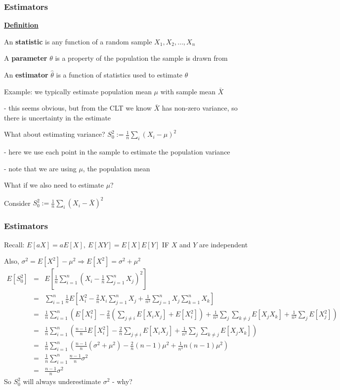 \documentclass[t,8pt]{beamer}%
\begin{document}
\begin{frame}
	\frametitle{Estimators}
        {\bf\underline{Definition}} \par
        An {\bf statistic} is any function of a random sample $X_1,X_2,\dots,X_n$ \par
        A {\bf parameter} $\theta$ is a property of the population the sample is drawn from \par
        An {\bf estimator} $\hat\theta$ is a function of statistics used to estimate $\theta$ \par
	Example: we typically estimate population mean $\mu$ with sample mean $\bar X$\par
	{\small\color{NavyBlue} - this seems obvious, but from the CLT we know $\bar X$ has non-zero variance, so there is uncertainty in the estimate} \par
	What about estimating variance?
	$S_0^2:=\frac 1n\sum_i(X_i-\mu)^2$ \par
	{\small\color{NavyBlue} - here we use each point in the sample to estimate the population variance \par
		- note that we are using $\mu$, the population mean} \par
	What if we also need to estimate $\mu$? \par Consider $S_0^2:=\frac 1n\sum_i(X_i-\bar X)^2$
\end{frame}

	\begin{frame}
		\frametitle{Estimators}
		Recall: $E[aX]=aE[X],\ E[XY]=E[X]E[Y]$ IF $X$ and $Y$ are independent \par
		Also, $\sigma^2=E[X^2]-\mu^2\Rightarrow E[X^2]=\sigma^2+\mu^2$
		{\tiny
			\begin{eqnarray*}
				E[S_0^2]&=&E\left[\frac 1n\sum_{i=1}^n\left(X_i-\frac 1n\sum_{j=1}^nX_j\right)^2\right] \\
				&=&\sum_{i=1}^n\frac 1nE\left[X_i^2-\frac 2nX_i\sum_{j=1}^nX_j+\frac 1{n^2}\sum_{j=1}^nX_j\sum_{k=1}^nX_k\right] \\
				&=&\frac 1n\sum_{i=1}^n\left(E[X_i^2]-\frac 2n\left(\sum_{j\neq i}E[X_iX_j]+E[X_i^2]\right)+\frac 1{n^2}\sum_j\sum_{k\neq j}E[X_jX_k]+\frac 1{n^2}\sum_jE[X_j^2]\right) \\
				&=&\frac 1n\sum_{i=1}^n\left(\frac{n-1}nE[X_i^2]-\frac 2n\sum_{j\neq i}E[X_iX_j]+\frac 1{n^2}\sum_j\sum_{k\neq j}E[X_jX_k]\right) \\
				&=&\frac 1n\sum_{i=1}^n\left(\frac{n-1}n(\sigma^2+\mu^2)-\frac 2n(n-1)\mu^2+\frac 1{n^2}n(n-1)\mu^2\right) \\
                &=&\frac 1n\sum_{i=1}^n\frac{n-1}n\sigma^2 \\
				&=&\frac{n-1}n\sigma^2 
			\end{eqnarray*}
		}
		So $S_0^2$ will always underestimate $\sigma^2$ - why?
	\end{frame}
\end{document}
